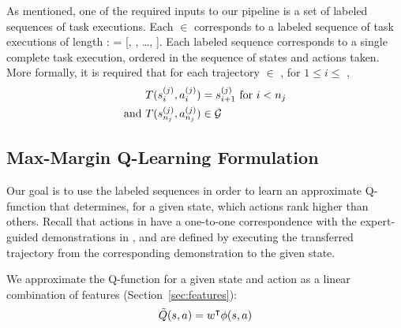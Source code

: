 As mentioned, one of the required inputs to our pipeline is a set 
of labeled sequences of task executions. Each  $\in$ 
corresponds to a labeled sequence of
task executions of length :  = [,
, \ldots, ]. Each labeled sequence corresponds
to a single complete task execution, ordered in the sequence of states and
actions taken. More formally, it is required that for each trajectory
 $\in$ , for $1 \leq i \leq$ ,
\begin{align*}
T(s_{i}^{(j)}, a_{i}^{(j)}) &= s_{i+1}^{(j)} \text{ for } i < n_{j} \\
\text{and } T(s_{n_{j}}^{(j)}, a_{n_{j}}^{(j)}) &\in \mathcal{G}{}
\end{align*}

\subsection{Max-Margin Q-Learning Formulation}
Our goal is to use the labeled sequences  in order to learn an
approximate Q-function that determines, for a given state, which actions
rank higher than others.
Recall that actions in \actionset{} have a one-to-one correspondence with the
expert-guided demonstrations in \demoset{}, and are defined by executing the
transferred trajectory from the corresponding demonstration to the given state.

We approximate the Q-function for a given state \statevar{} and action
\actionvar{} as a linear combination of features \features{\statevar{}}{\actionvar{}}
(Section~\ref{sec:features}):
\begin{equation}
\tilde{Q}(s{}, a{}) = w^\intercal{} \phi({s{}}, {a{}})
\end{equation}

